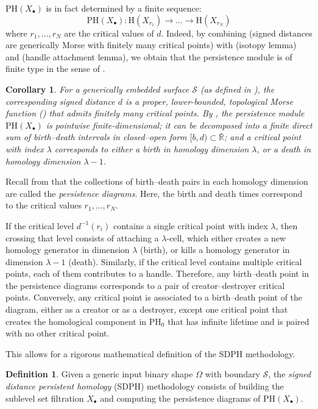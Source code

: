 \documentclass[11pt]{article}
\newcommand{\R}{\mathbb{R}}
\newcommand{\PH}{\mathrm{PH}}
\newcommand{\W}{\Omega}
\newcommand{\Xb}{X_\bullet}
\newcommand{\Surf}{\mathcal{S}}
\renewcommand{\H}{\mathrm{H}}
\theoremstyle{plain}
\newtheorem{cor}{Corollary}
\theoremstyle{definition}
\newtheorem{defi}{Definition}
\theoremstyle{remark}
\begin{document}
	$\PH(\Xb)$ is in fact determined by a finite sequence:
	\[\PH(\Xb) : \H(X_{r_1}) \to \ldots \to \H(X_{r_N})\]
	where $r_1,\ldots,r_N$ are the critical values of $d$. Indeed, by combining  (signed distances are generically Morse with finitely many critical points)
	with  (isotopy lemma) and  (handle attachment lemma), we obtain that the persistence module is of finite type in the sense of \cite[Section 3.8]{chazal_stability_2007}. 
	
	\begin{cor} \label{cor:gendistPH_finite}
		For a generically embedded surface $\Surf$ (as defined in ), the corresponding signed distance $d$ is a proper, lower-bounded, topological Morse function () that admits finitely many critical points. By , the persistence module $\PH(\Xb)$ is pointwise finite-dimensional; it can be decomposed into a finite direct sum of birth--death intervals in closed--open form $[b,d) \subset \bar{\R}$;
		and a critical point with index $\lambda$ corresponds to either a birth in homology dimension $\lambda$, or a death in homology dimension $\lambda - 1$.
	\end{cor}
	Recall from  that the collections of birth--death pairs in each homology dimension are called the \textit{persistence diagrams}. 
	Here, the birth and death times correspond to the critical values $r_1, \ldots, r_N$.
	
	If the critical level $d^{-1}(r_i)$ contains a single critical point with index $\lambda$, then crossing that level consists of attaching a $\lambda$-cell, which either creates a new homology generator in dimension $\lambda$ (birth), or kills a homology generator in dimension $\lambda - 1$ (death). Similarly, if the critical level contains multiple critical points, each of them contributes to a handle. Therefore, any birth--death point in the persistence diagrams corresponds to a pair of creator--destroyer critical points.  Conversely, any critical point is associated to a birth--death point of the diagram, either as a creator or as a destroyer, except one critical point that creates the homological component in $\PH_0$ that has infinite lifetime and is paired with no other critical point.
	
	This allows for a rigorous mathematical definition of the SDPH methodology.
	\begin{defi}
		Given a generic input binary shape $\W$ with boundary $\Surf$, the \emph{signed distance persistent homology} (SDPH) methodology consists of building the sublevel set filtration $\Xb$ and computing the persistence diagrams of $\PH(\Xb)$.
	\end{defi}
	
\end{document}
